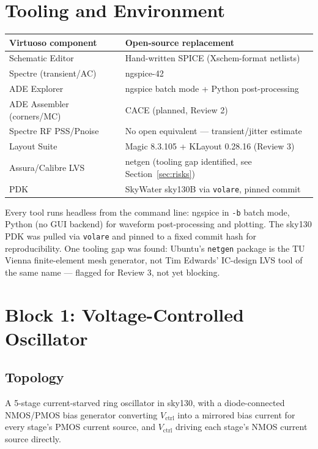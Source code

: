 \documentclass[11pt]{article}
\begin{document}
\section{Tooling and Environment}

\begin{table}[h]
\centering
\small
\begin{tabular}{ll}
\toprule
\textbf{Virtuoso component} & \textbf{Open-source replacement} \\
\midrule
Schematic Editor & Hand-written SPICE (Xschem-format netlists) \\
Spectre (transient/AC) & ngspice-42 \\
ADE Explorer & ngspice batch mode + Python post-processing \\
ADE Assembler (corners/MC) & CACE (planned, Review 2) \\
Spectre RF PSS/Pnoise & No open equivalent --- transient/jitter estimate \\
Layout Suite & Magic 8.3.105 + KLayout 0.28.16 (Review 3) \\
Assura/Calibre LVS & netgen (tooling gap identified, see Section~\ref{sec:risks}) \\
PDK & SkyWater sky130B via \texttt{volare}, pinned commit \\
\bottomrule
\end{tabular}
\end{table}

Every tool runs headless from the command line: ngspice in \texttt{-b} batch mode, Python (no GUI backend) for waveform post-processing and plotting. The sky130 PDK was pulled via \texttt{volare} and pinned to a fixed commit hash for reproducibility. One tooling gap was found: Ubuntu's \texttt{netgen} package is the TU Vienna finite-element mesh generator, not Tim Edwards' IC-design LVS tool of the same name --- flagged for Review 3, not yet blocking.

\section{Block 1: Voltage-Controlled Oscillator}
\label{sec:vco}

\subsection{Topology}
A 5-stage current-starved ring oscillator in sky130, with a diode-connected NMOS/PMOS bias generator converting $V_{\text{ctrl}}$ into a mirrored bias current for every stage's PMOS current source, and $V_{\text{ctrl}}$ driving each stage's NMOS current source directly.
\end{document}
